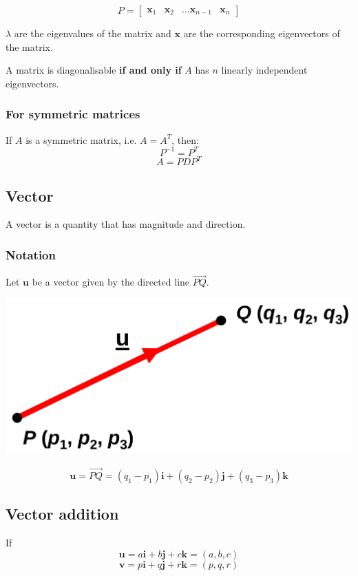 \documentclass[11pt]{article}
\begin{document}
\begin{displaymath}
P = \begin{bmatrix}
\boldsymbol{x}_1 & \boldsymbol{x}_2 & \ldots \boldsymbol{x}_{n-1} & \boldsymbol{x}_{n}
\end{bmatrix}
\end{displaymath}

\(\lambda\) are the eigenvalues of the matrix and \(\boldsymbol{x}\) are the corresponding eigenvectors of the matrix.


A matrix is diagonalisable \textbf{if and only if} \(A\) has \(n\) linearly independent eigenvectors.
\subsubsection{For symmetric matrices}
\label{sec:orgaee026f}
If \(A\) is a symmetric matrix, i.e. \(A = A^T\), then:
\[P^{-1} = P^T\]
\[A = PDP^T\]
\subsection{Vector}
\label{sec:orgb73ed66}
A vector is a quantity that has magnitude and direction.
\subsubsection{Notation}
\label{sec:orge360800}
Let \(\boldsymbol{u}\) be a vector given by the directed line \(\overrightarrow{PQ}\).
\begin{center}
\includegraphics[width=.9\linewidth]{./images/vector-notation-line-pq.png}
\end{center}

\[\boldsymbol{u} = \overrightarrow{PQ} = (q_1 - p_1) \boldsymbol{i} + (q_2 - p_2) \boldsymbol{j} + (q_3 - p_3) \boldsymbol{k}\]
\subsection{Vector addition}
\label{sec:orgb7356c2}
If
\[\boldsymbol{u} = a \boldsymbol{i} + b \boldsymbol{j} + c \boldsymbol{k} = (a, b, c)\]
\[\boldsymbol{v} = p \boldsymbol{i} + q \boldsymbol{j} + r \boldsymbol{k} = (p, q, r)\]
\end{document}
